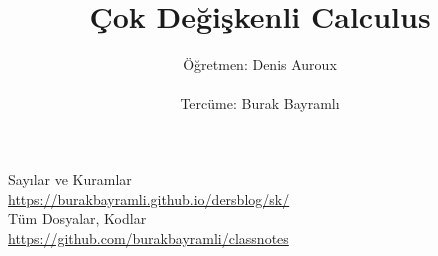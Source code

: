 \documentclass[12pt,a4paper]{report}
\title{Çok Değişkenli Calculus}
\author{Öğretmen: Denis Auroux \\ \\ Tercüme: Burak Bayramlı}
\date{}
\begin{document}
\maketitle

\newpage


\begin{figure}[!hbp]
\end{figure}


\vspace*{4cm}
\begin{center}
\vspace{0.5cm}
Sayılar ve Kuramlar\\
\vspace{0.5cm}
\url{https://burakbayramli.github.io/dersblog/sk/}\\
\vspace{0.5cm}
Tüm Dosyalar, Kodlar\\
\vspace{0.5cm}
\url{https://github.com/burakbayramli/classnotes}\\
\end{center}
\end{document}
